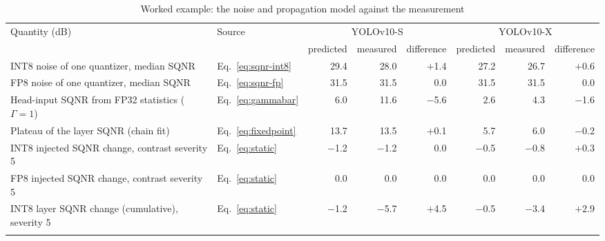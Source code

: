 \documentclass[pdflatex,sn-mathphys-num]{sn-jnl}%
\theoremstyle{thmstyleone}%
\theoremstyle{thmstyletwo}%
\theoremstyle{thmstylethree}%
\begin{document}
\begin{appendices}
\begin{table}
\footnotesize\setlength{\tabcolsep}{4pt}
\caption{Worked example: the noise and propagation model against the measurement}\label{tab:modelcheck}
\begin{tabular}{@{}llrrrrrr@{}}
\toprule
Quantity (dB) & Source & \multicolumn{3}{c}{YOLOv10-S} & \multicolumn{3}{c}{YOLOv10-X} \\
\cmidrule{3-5}\cmidrule{6-8}
 & & predicted & measured & difference & predicted & measured & difference \\
\midrule
INT8 noise of one quantizer, median SQNR & Eq.~\eqref{eq:sqnr-int8} & 29.4 & 28.0 & $+$1.4 & 27.2 & 26.7 & $+$0.6 \\
FP8 noise of one quantizer, median SQNR & Eq.~\eqref{eq:sqnr-fp} & 31.5 & 31.5 & 0.0 & 31.5 & 31.5 & 0.0 \\
Head-input SQNR from FP32 statistics ($\Gamma=1$) & Eq.~\eqref{eq:gammabar} & 6.0 & 11.6 & $-$5.6 & 2.6 & 4.3 & $-$1.6 \\
Plateau of the layer SQNR (chain fit) & Eq.~\eqref{eq:fixedpoint} & 13.7 & 13.5 & $+$0.1 & 5.7 & 6.0 & $-$0.2 \\
INT8 injected SQNR change, contrast severity 5 & Eq.~\eqref{eq:static} & $-$1.2 & $-$1.2 & 0.0 & $-$0.5 & $-$0.8 & $+$0.3 \\
FP8 injected SQNR change, contrast severity 5 & Eq.~\eqref{eq:static} & 0.0 & 0.0 & 0.0 & 0.0 & 0.0 & 0.0 \\
INT8 layer SQNR change (cumulative), severity 5 & Eq.~\eqref{eq:static} & $-$1.2 & $-$5.7 & $+$4.5 & $-$0.5 & $-$3.4 & $+$2.9 \\
\botrule
\end{tabular}
\end{table}


\end{appendices}
\end{document}
